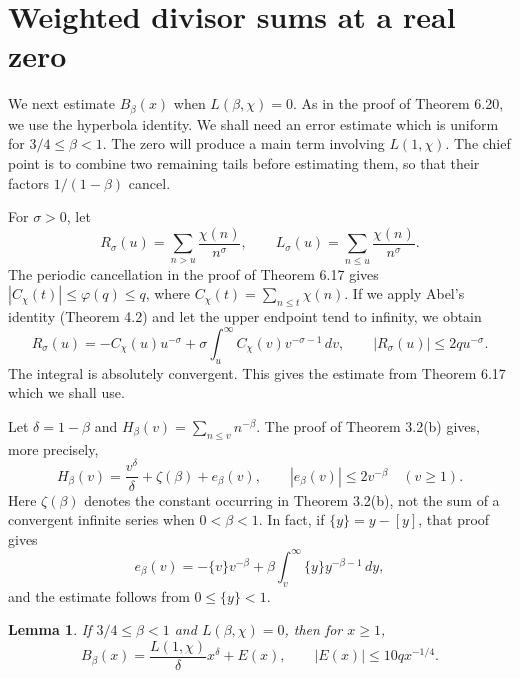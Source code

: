 \documentclass[11pt,twoside,leqno]{article}
\theoremstyle{apostol}
\newtheorem{lemma}[theorem]{Lemma}
\newcommand{\fl}[1]{\left[#1\right]}
\begin{document}
\section{Weighted divisor sums at a real zero}
\label{sec:zero}

We next estimate \(B_\beta(x)\) when \(L(\beta,\chi)=0\). As in the proof of
Theorem 6.20, we use the hyperbola identity. We shall need an error estimate
which is uniform for \(3/4\le\beta<1\). The zero will produce a main term
involving \(L(1,\chi)\). The chief point is to combine two remaining tails
before estimating them, so that their factors \(1/(1-\beta)\) cancel.

For \(\sigma>0\), let
\[
 R_\sigma(u)=\sum_{n>u}\frac{\chi(n)}{n^\sigma},\qquad
 L_\sigma(u)=\sum_{n\le u}\frac{\chi(n)}{n^\sigma}.
\]
The periodic cancellation in the proof of Theorem 6.17 gives
\(|C_\chi(t)|\le\varphi(q)\le q\), where
\(C_\chi(t)=\sum_{n\le t}\chi(n)\). If we apply Abel's identity
(Theorem 4.2) and let the upper endpoint tend to infinity, we obtain
\begin{equation}\label{eq:tail}
 R_\sigma(u)=-C_\chi(u)u^{-\sigma}
       +\sigma\int_u^\infty C_\chi(v)v^{-\sigma-1}\,dv,
 \qquad |R_\sigma(u)|\le2qu^{-\sigma}.
\end{equation}
The integral is absolutely convergent. This gives the estimate from
Theorem 6.17 which we shall use.

Let \(\delta=1-\beta\) and
\(H_\beta(v)=\sum_{n\le v}n^{-\beta}\). The proof of Theorem 3.2(b) gives,
more precisely,
\begin{equation}\label{eq:powersum}
 H_\beta(v)=\frac{v^\delta}{\delta}+\zeta(\beta)+e_\beta(v),
 \qquad |e_\beta(v)|\le2v^{-\beta}\quad(v\ge1).
\end{equation}
Here \(\zeta(\beta)\) denotes the constant occurring in Theorem 3.2(b),
not the sum of a convergent infinite series when \(0<\beta<1\).
In fact, if \(\{y\}=y-\fl y\), that proof gives
\[
 e_\beta(v)=-\{v\}v^{-\beta}
   +\beta\int_v^\infty\{y\}y^{-\beta-1}\,dy,
\]
and the estimate follows from \(0\le\{y\}<1\).

\begin{lemma}\label{lem:model}
If \(3/4\le\beta<1\) and \(L(\beta,\chi)=0\), then for \(x\ge1\),
\begin{equation}\label{eq:model}
 B_\beta(x)=\frac{L(1,\chi)}{\delta}x^\delta+E(x),
 \qquad |E(x)|\le10q x^{-1/4}.
\end{equation}
\end{lemma}
\end{document}
